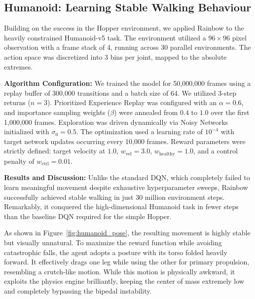 \subsection{Humanoid: Learning Stable Walking Behaviour}

Building on the success in the Hopper environment, we applied Rainbow to the heavily constrained Humanoid-v5 task. The environment utilized a $96 \times 96$ pixel observation with a frame stack of 4, running across 30 parallel environments. The action space was discretized into 3 bins per joint, mapped to the absolute extremes.

\textbf{Algorithm Configuration:}
We trained the model for 50,000,000 frames using a replay buffer of 300,000 transitions and a batch size of 64. We utilized 3-step returns ($n=3$). Prioritized Experience Replay was configured with an $\alpha = 0.6$, and importance sampling weights ($\beta$) were annealed from $0.4$ to $1.0$ over the first 1,000,000 frames. Exploration was driven dynamically via Noisy Networks initialized with $\sigma_0 = 0.5$. The optimization used a learning rate of $10^{-4}$ with target network updates occurring every 10,000 frames. Reward parameters were strictly defined: target velocity at $1.0$, $w_{\text{vel}} = 3.0$, $w_{\text{healthy}} = 1.0$, and a control penalty of $w_{\text{ctrl}} = 0.01$.

\textbf{Results and Discussion:}
Unlike the standard DQN, which completely failed to learn meaningful movement despite exhaustive hyperparameter sweeps, Rainbow successfully achieved stable walking in just 30 million environment steps. Remarkably, it conquered the high-dimensional Humanoid task in fewer steps than the baseline DQN required for the simple Hopper.

As shown in Figure~\ref{fig:humanoid_pose}, the resulting movement is highly stable but visually unnatural. To maximize the reward function while avoiding catastrophic falls, the agent adopts a posture with its torso folded heavily forward. It effectively drags one leg while using the other for primary propulsion, resembling a crutch-like motion. While this motion is physically awkward, it exploits the physics engine brilliantly, keeping the center of mass extremely low and completely bypassing the bipedal instability.